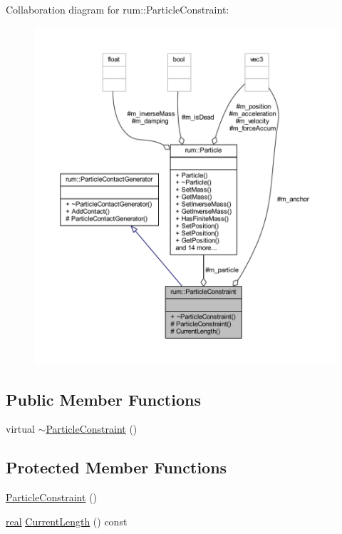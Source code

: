 Collaboration diagram for rum\+:\+:Particle\+Constraint\+:\nopagebreak
\begin{figure}[H]
\begin{center}
\leavevmode
\includegraphics[width=350pt]{classrum_1_1_particle_constraint__coll__graph}
\end{center}
\end{figure}
\subsection*{Public Member Functions}
\begin{DoxyCompactItemize}
\item 
virtual \hyperlink{classrum_1_1_particle_constraint_a746b1856af604ddc7e0b763114b11d43}{$\sim$\+Particle\+Constraint} ()
\end{DoxyCompactItemize}
\subsection*{Protected Member Functions}
\begin{DoxyCompactItemize}
\item 
\hyperlink{classrum_1_1_particle_constraint_aee5151f3813c45df9e65bf5ae29ba1d1}{Particle\+Constraint} ()
\item 
\hyperlink{namespacerum_a7e8cca23573d5eaead0f138cbaa4862c}{real} \hyperlink{classrum_1_1_particle_constraint_af25a22237b3b55adf9dcf6c44b19f245}{Current\+Length} () const
\end{DoxyCompactItemize}
